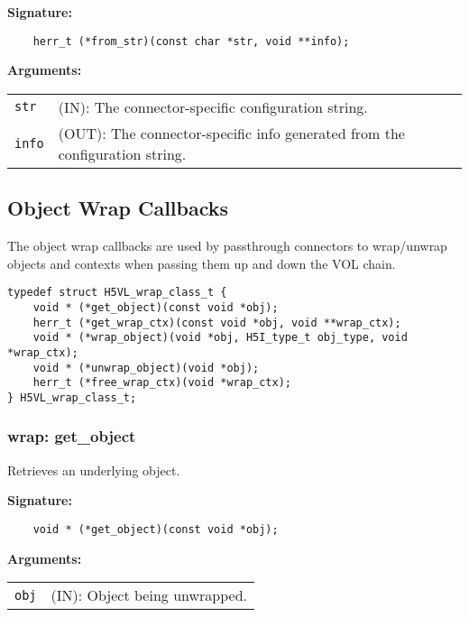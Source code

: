\begin{mdframed}[style=bgbox]
\textbf{Signature:}
\begin{lstlisting}
    herr_t (*from_str)(const char *str, void **info);
\end{lstlisting}
\textbf{Arguments:}\\
\begin{tabular}{l p{13.5cm}}
  \texttt{str} & (IN): The connector-specific configuration string.\\
  \texttt{info} & (OUT): The connector-specific info generated from the configuration string.\\
\end{tabular}
\end{mdframed}



\subsection{Object Wrap Callbacks}
The object wrap callbacks are used by passthrough connectors to wrap/unwrap
objects and contexts when passing them up and down the VOL chain.

\begin{lstlisting}[caption={Wrap class for object wrapping routines, H5VLconnector.h}, captionpos=b, label={lst:Wrapclass}]
typedef struct H5VL_wrap_class_t {                                               
    void * (*get_object)(const void *obj);
    herr_t (*get_wrap_ctx)(const void *obj, void **wrap_ctx);
    void * (*wrap_object)(void *obj, H5I_type_t obj_type, void *wrap_ctx);
    void * (*unwrap_object)(void *obj);
    herr_t (*free_wrap_ctx)(void *wrap_ctx);
} H5VL_wrap_class_t; 
\end{lstlisting}

\subsubsection{wrap: get\_object}
Retrieves an underlying object.

\begin{mdframed}[style=bgbox]
\textbf{Signature:}
\begin{lstlisting}
    void * (*get_object)(const void *obj);
\end{lstlisting}

\textbf{Arguments:}\\
\begin{tabular}{l p{13.5cm}}
  \texttt{obj} & (IN): Object being unwrapped.\\
\end{tabular}
\end{mdframed}


